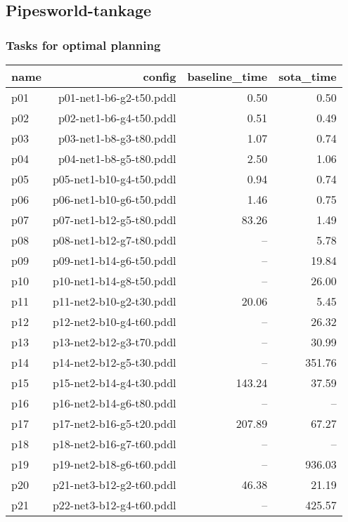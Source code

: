\documentclass{article}
\begin{document}
                \newpage \subsection{Pipesworld-tankage}
                    \subsubsection*{Tasks for optimal planning}
                    
                            \begin{center}
                            \scriptsize
                            \begin{tabular}{@{}l|r|r|r@{}}
                            name & config & baseline\_time & sota\_time\\\midrule
                              p01& p01-net1-b6-g2-t50.pddl&0.50&0.50\\
  p02& p02-net1-b6-g4-t50.pddl&0.51&0.49\\
  p03& p03-net1-b8-g3-t80.pddl&1.07&0.74\\
  p04& p04-net1-b8-g5-t80.pddl&2.50&1.06\\
  p05& p05-net1-b10-g4-t50.pddl&0.94&0.74\\
  p06& p06-net1-b10-g6-t50.pddl&1.46&0.75\\
  p07& p07-net1-b12-g5-t80.pddl&83.26&1.49\\
  p08& p08-net1-b12-g7-t80.pddl&--&5.78\\
  p09& p09-net1-b14-g6-t50.pddl&--&19.84\\
  p10& p10-net1-b14-g8-t50.pddl&--&26.00\\
  p11& p11-net2-b10-g2-t30.pddl&20.06&5.45\\
  p12& p12-net2-b10-g4-t60.pddl&--&26.32\\
  p13& p13-net2-b12-g3-t70.pddl&--&30.99\\
  p14& p14-net2-b12-g5-t30.pddl&--&351.76\\
  p15& p15-net2-b14-g4-t30.pddl&143.24&37.59\\
  p16& p16-net2-b14-g6-t80.pddl&--&--\\
  p17& p17-net2-b16-g5-t20.pddl&207.89&67.27\\
  p18& p18-net2-b16-g7-t60.pddl&--&--\\
  p19& p19-net2-b18-g6-t60.pddl&--&936.03\\
  p20& p21-net3-b12-g2-t60.pddl&46.38&21.19\\
  p21& p22-net3-b12-g4-t60.pddl&--&425.57\\

\end{tabular}
\end{center}
\end{document}
